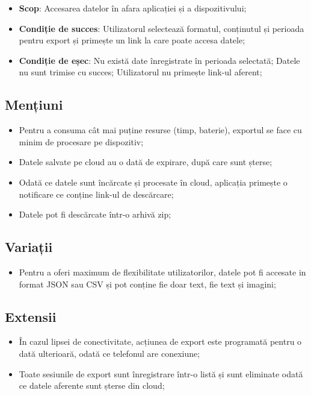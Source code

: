 \begin{itemize}
\item
  \textbf{Scop}: Accesarea datelor în afara aplicației și a dispozitivului;
\item
  \textbf{Condiție de succes}: Utilizatorul selectează formatul, conținutul și perioada pentru export și primește un link la care poate accesa datele;
\item
  \textbf{Condiție de eșec}: Nu există date înregistrate în perioada selectată; Datele nu sunt trimise cu succes; Utilizatorul nu primește link-ul aferent;
\end{itemize}

\begin{minipage}[t]{0.4\textwidth}

\subsection*{Mențiuni}\label{menux21biuni-3}

\begin{itemize}
  \item
  Pentru a consuma cât mai puține resurse (timp, baterie), exportul se face cu minim de procesare pe dispozitiv;
  \item
  Datele salvate pe cloud au o dată de expirare, după care sunt șterse;
  \item
  Odată ce datele sunt încărcate și procesate în cloud, aplicația primește o notificare ce conține link-ul de descărcare;
  \item
  Datele pot fi descărcate într-o arhivă zip;
\end{itemize}

\end{minipage}\hspace{0.05\textwidth}
\begin{minipage}[t]{0.55\textwidth}

\subsection*{Variații}\label{variaux21bii-2}

\begin{itemize}
\item
  Pentru a oferi maximum de flexibilitate utilizatorilor, datele pot fi accesate in format JSON sau CSV și pot conține fie doar text, fie text și imagini;
\end{itemize}

\subsection*{Extensii}\label{extensii-2}

\begin{itemize}
\item
  În cazul lipsei de conectivitate, acțiunea de export este programată pentru o dată ulterioară, odată ce telefonul are conexiune;
\item
  Toate sesiunile de export sunt înregistrare într-o listă și sunt eliminate odată ce datele aferente sunt șterse din cloud;
\end{itemize}

\end{minipage}




